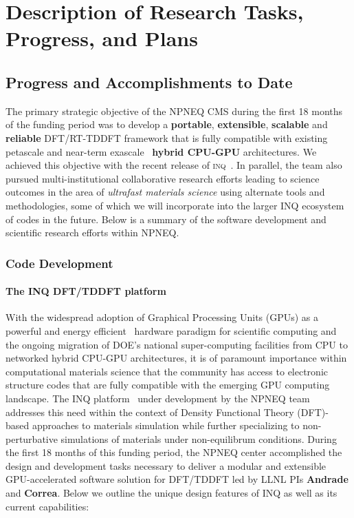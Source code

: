 \section{Description of Research Tasks, Progress, and Plans}
\label{sec:research}


\subsection{Progress and Accomplishments to Date}

The primary strategic objective of the NPNEQ CMS during the first 18 months of the funding period was to develop a \textbf{portable}, \textbf{extensible}, \textbf{scalable} and \textbf{reliable} DFT/RT-TDDFT framework that is fully compatible with existing petascale and near-term exascale~\cite{Kothe2019} \textbf{hybrid CPU-GPU} architectures.
We achieved this objective with the recent release of \textsc{inq}~\cite{Andrade2021}. 
In parallel, the team also pursued multi-institutional collaborative research efforts leading to science outcomes in the area of \emph{ultrafast materials science} using alternate tools and methodologies, some of which we will incorporate into the larger INQ ecosystem of codes in the future. 
Below is a summary of the software development and scientific research efforts within NPNEQ.

\subsubsection{Code Development}
\label{subsubsec:Code}
\paragraph{The INQ DFT/TDDFT platform}


With the widespread adoption of Graphical Processing Units (GPUs) as a powerful and energy efficient~\cite{Huang2009} hardware paradigm for scientific computing and the ongoing migration of DOE's national super-computing facilities from CPU to networked hybrid CPU-GPU architectures, it is of paramount importance within computational materials science that the community has access to electronic structure codes that are fully compatible with the emerging GPU computing landscape.
The INQ platform~\cite{Andrade2021} under development by the NPNEQ team addresses this need within the context of Density Functional Theory (DFT)-based approaches to materials simulation while further specializing to non-perturbative simulations of materials under non-equilibrum conditions.
During the first 18 months of this funding period, the NPNEQ center accomplished the design and development tasks necessary to deliver a modular and extensible GPU-accelerated software solution for DFT/TDDFT led by LLNL PIs \textbf{Andrade} and \textbf{Correa}.
Below we outline the unique design features of INQ as well as its current capabilities:

